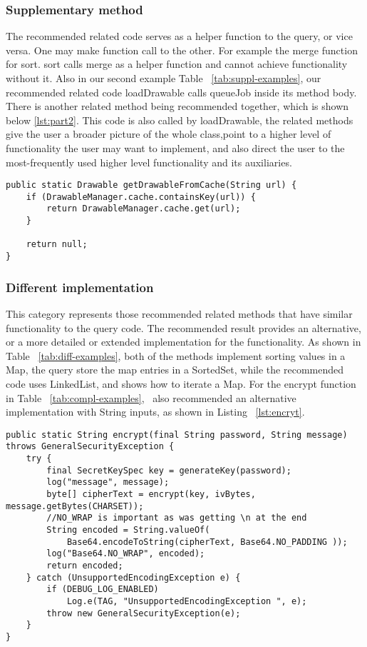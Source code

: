 \subsubsection{Supplementary method} The recommended related code serves as a helper function to the query, or vice versa. One may make function call to the other. For example the {\ttt merge} function for {\ttt sort}. {\ttt sort} calls {\ttt merge} as a helper function and cannot achieve functionality without it. Also in our second example Table ~\ref{tab:suppl-examples}, our recommended related code {\ttt loadDrawable} calls {\ttt queueJob} inside its method body. There is another related method being recommended together, which is shown below \ref{lst:part2}. This code is also called by {\ttt loadDrawable}, the related methods give the user a broader picture of the whole class,point to a higher level of functionality the user may want to implement, and also direct the user to the most-frequently used higher level functionality and its auxiliaries.
\begin{lstlisting}[caption={Recommended code \#2}, label={lst:part2}]
public static Drawable getDrawableFromCache(String url) {
	if (DrawableManager.cache.containsKey(url)) {
		return DrawableManager.cache.get(url);
	}
	
	return null;
}	
\end{lstlisting}

\subsubsection{Different implementation} This category represents those recommended related methods that have similar functionality to the query code. The recommended result provides an alternative, or a more detailed or extended implementation for the functionality. As shown in Table ~\ref{tab:diff-examples}, both of the methods implement sorting values in a {\ttt Map}, the query store the map entries in a {\ttt SortedSet}, while the recommended code uses {\ttt LinkedList}, and shows how to iterate a {\ttt Map}. For the {\ttt encrypt} function in Table ~\ref{tab:compl-examples}, \tool\ also recommended an alternative implementation with {\ttt String} inputs, as shown in Listing ~\ref{lst:encryt}.


\begin{lstlisting}[caption={different implementation for \texttt{encrypt}}, label={lst:encryt}]
public static String encrypt(final String password, String message) throws GeneralSecurityException {
	try {
		final SecretKeySpec key = generateKey(password);
		log("message", message);
		byte[] cipherText = encrypt(key, ivBytes, message.getBytes(CHARSET));
		//NO_WRAP is important as was getting \n at the end
		String encoded = String.valueOf(
			Base64.encodeToString(cipherText, Base64.NO_PADDING ));
		log("Base64.NO_WRAP", encoded);
		return encoded;
	} catch (UnsupportedEncodingException e) {
		if (DEBUG_LOG_ENABLED)
			Log.e(TAG, "UnsupportedEncodingException ", e);
		throw new GeneralSecurityException(e);
	}
}
\end{lstlisting}



